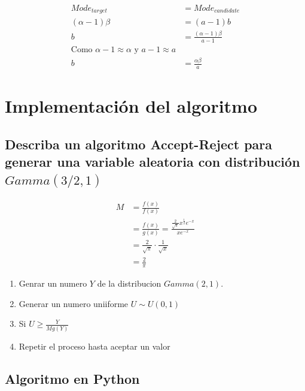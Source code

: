 \documentclass{article}
\begin{document}
\[
	\begin{split}
		Mode_{target}     & = Mode_{candidate}                    \\
		(\alpha - 1)\beta & = (a - 1)b                            \\
		b                 & = \frac{(\alpha - 1)\beta}{a-1}       \\
		\text{Como $\alpha -1 \approx \alpha $ y $a-1 \approx a$} \\
		b                 & = \frac{\alpha \beta}{a}
	\end{split}
\]

\section{Implementación del algoritmo}

\subsection{Describa un algoritmo \textbf{Accept-Reject} para generar una variable aleatoria con distribución $Gamma(3/2,1)$}

\[
	\begin{split}
		M & = \frac{f(x)}{f(x)}                                                                \\
		  & = \frac{f(x)}{g(x)} = \frac{\frac{2}{\sqrt{\pi}} x^{\frac{1}{2}} e^{-x}}{x e^{-x}} \\
		  & = \frac{2}{\sqrt{\pi}} \cdot \frac{1}{\sqrt{x}}                                    \\
		  & = \frac{2}{\pi}
	\end{split}
\]


\begin{enumerate}
	\item Genrar un numero $Y$ de la distribucion $Gamma(2,1)$.
	\item Generar un numero uniiforme $U \sim U(0,1)$
	\item Si $U \ge \frac{Y}{M g(Y)}$
	\item Repetir el proceso hasta aceptar un valor
\end{enumerate}


\subsection{Algoritmo en Python}
\begin{pythonbox}
	\inputminted{python}{accept.py}
\end{pythonbox}
\end{document}
